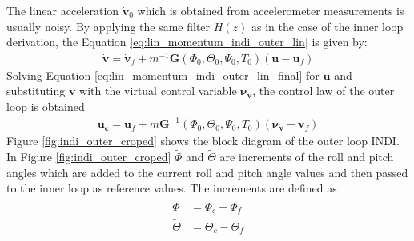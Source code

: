 \documentclass[11pt, a4paper, twoside]{report}
\begin{document}
The linear acceleration $\bm{\dot{v}}_0$ which is obtained from accelerometer measurements is usually noisy. By applying the same filter $H(z)$ as in the case of the inner loop derivation, the Equation \ref{eq:lin_momentum_indi_outer_lin} is given by:
\begin{equation}
	\begin{split}
		\bm{\dot{v}} = \bm{\dot{v}}_f +  m^{-1} \bm{G}(\Phi_0, \Theta_0, \Psi_0, T_0) (\bm{u} - \bm{u}_f)
		\label{eq:lin_momentum_indi_outer_lin_final}
	\end{split}
\end{equation}
Solving Equation \ref{eq:lin_momentum_indi_outer_lin_final} for $\bm{u}$ and substituting $\bm{\dot{v}}$ with the virtual control variable $\bm{\nu}_{\bm{\dot{v}}}$, the control law of the outer loop is obtained
\begin{equation}
	\begin{split}
		\bm{u_c} = \bm{u}_f +  m \bm{G}^{-1}(\Phi_0, \Theta_0, \Psi_0, T_0) (\bm{\nu}_{\bm{\dot{v}}} - \bm{\dot{v}}_f)
		\label{eq:indi_outer_control_law}
	\end{split}
\end{equation}
Figure \ref{fig:indi_outer_croped} shows the block diagram of the outer loop \acrshort{INDI}. In Figure \ref{fig:indi_outer_croped} $\tilde{\Phi}$ and $\tilde{\Theta}$ are increments of the roll and pitch angles which are added to the current roll and pitch angle values and then passed to the inner loop as reference values. The increments are defined as 
\begin{subequations}
	\begin{align}
		\tilde{\Phi} &= \Phi_c - \Phi_f \label{eq:roll_increment} \\
		\tilde{\Theta} &= \Theta_c - \Theta_f \label{eq:pitch_increment}
	\end{align}
	\label{eq:rool_pitch_increments}
\end{subequations}
\end{document}
